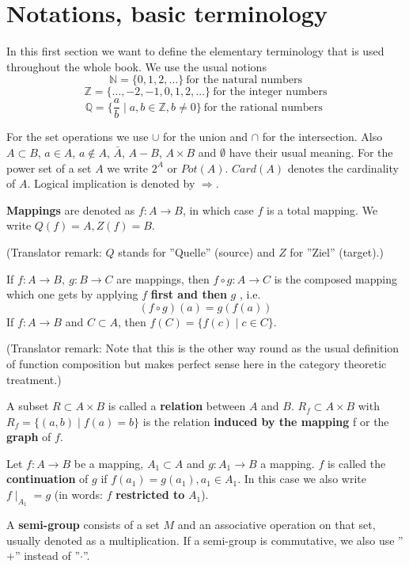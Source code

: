 \section{Notations, basic terminology}

In this first section we want to define the elementary terminology that is
used throughout the whole book. We use the usual notions
\[ \mathbb{N} = \{ 0, 1, 2, \ldots \}\ \mbox{for the natural numbers} \]
\[ \mathbb{Z} = \{ \ldots, -2, -1, 0, 1, 2, \ldots \}\ \mbox{for the integer
numbers} \]
\[ \mathbb{Q} = \{ \frac{a}{b} \mid a,b \in \mathbb{Z}, b \neq 0 \}\ \mbox{for
the rational numbers } \]

For the set operations we use $\cup$ for the union and $\cap$ for the
intersection. Also $A \subset B$, $a \in A$, $a \not\in A$, $\bar{A}$, $A - B$,
$A \times B$ and $\emptyset$ have their usual meaning. For the power set of a
set $A$ we write $2^A$ or $Pot(A)$. $Card(A)$ denotes the cardinality of $A$.
Logical implication is denoted by $\Rightarrow$.

{\bf Mappings} are denoted as $f : A \rightarrow B$, in which case $f$ is a
total mapping. We write $Q(f) = A, Z(f) = B$. 

(Translator remark: $Q$ stands for ''Quelle'' (source)
and $Z$ for ''Ziel'' (target).)

If $f: A \rightarrow B,\ g : B \rightarrow C$ are mappings, then $f \circ g : A
\rightarrow C$ is the composed mapping which one gets by applying \boldmath $f$
{\bf first and then} $g$ \unboldmath, i.e. \[(f \circ g)(a) = g(f(a))\]
If $f:A \rightarrow B$ and $C \subset A$, then $f(C) = \{ f(c) \mid c \in C \}$.

(Translator remark: Note that this is the other way round as the usual
definition of function composition but makes perfect sense here in the category theoretic
treatment.)

A subset $R \subset A \times B$ is called a {\bf relation} between $A$ and $B$.
$R_f \subset A \times B$ with $R_f = \{ (a,b) \mid f(a) = b \}$ is the relation
{\bf induced by the mapping} f or the {\bf graph} of $f$.

Let $f : A \rightarrow B$ be a mapping, $A_1 \subset A$ and $g : A_1 \rightarrow
B$ a mapping. $f$ is called the {\bf continuation} of $g$ if $f(a_1) = g(a_1),
a_1 \in A_1$. In this case we also write $f \mid _{A_1} = g$ (in words: $f$
{\bf restricted to} $A_1$).

A {\bf semi-group} consists of a set $M$ and an associative operation on that
set, usually denoted as a multiplication. If a semi-group is commutative, we
also use ''$+$'' instead of ''$\cdot$''.

